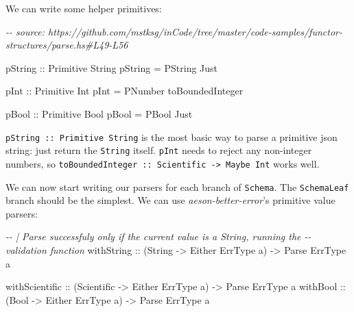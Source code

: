 \documentclass[]{article}
\newenvironment{Shaded}{}{}
\newcommand{\CommentTok}[1]{\textcolor[rgb]{0.38,0.63,0.69}{\textit{#1}}}
\newcommand{\DataTypeTok}[1]{\textcolor[rgb]{0.56,0.13,0.00}{#1}}
\newcommand{\NormalTok}[1]{#1}
\newcommand{\OtherTok}[1]{\textcolor[rgb]{0.00,0.44,0.13}{#1}}
\begin{document}
We can write some helper primitives:

\begin{Shaded}
\begin{Highlighting}[]
\CommentTok{{-}{-} source: https://github.com/mstksg/inCode/tree/master/code{-}samples/functor{-}structures/parse.hs\#L49{-}L56}

\OtherTok{pString ::} \DataTypeTok{Primitive} \DataTypeTok{String}
\NormalTok{pString }\OtherTok{=} \DataTypeTok{PString} \DataTypeTok{Just}

\OtherTok{pInt ::} \DataTypeTok{Primitive} \DataTypeTok{Int}
\NormalTok{pInt }\OtherTok{=} \DataTypeTok{PNumber}\NormalTok{ toBoundedInteger}

\OtherTok{pBool ::} \DataTypeTok{Primitive} \DataTypeTok{Bool}
\NormalTok{pBool }\OtherTok{=} \DataTypeTok{PBool} \DataTypeTok{Just}
\end{Highlighting}
\end{Shaded}

\texttt{pString\ ::\ Primitive\ String} is the most basic way to parse a
primitive json string: just return the \texttt{String} itself. \texttt{pInt}
needs to reject any non-integer numbers, so
\texttt{toBoundedInteger\ ::\ Scientific\ -\textgreater{}\ Maybe\ Int} works
well.

We can now start writing our parsers for each branch of \texttt{Schema}. The
\texttt{SchemaLeaf} branch should be the simplest. We can use
\emph{aeson-better-error}'s primitive value parsers:

\begin{Shaded}
\begin{Highlighting}[]
\CommentTok{{-}{-} | Parse successfuly only if the current value is a String, running the}
\CommentTok{{-}{-} validation function}
\OtherTok{withString     ::}\NormalTok{ (}\DataTypeTok{String}     \OtherTok{{-}\textgreater{}} \DataTypeTok{Either} \DataTypeTok{ErrType}\NormalTok{ a) }\OtherTok{{-}\textgreater{}} \DataTypeTok{Parse} \DataTypeTok{ErrType}\NormalTok{ a}

\OtherTok{withScientific ::}\NormalTok{ (}\DataTypeTok{Scientific} \OtherTok{{-}\textgreater{}} \DataTypeTok{Either} \DataTypeTok{ErrType}\NormalTok{ a) }\OtherTok{{-}\textgreater{}} \DataTypeTok{Parse} \DataTypeTok{ErrType}\NormalTok{ a}
\OtherTok{withBool       ::}\NormalTok{ (}\DataTypeTok{Bool}       \OtherTok{{-}\textgreater{}} \DataTypeTok{Either} \DataTypeTok{ErrType}\NormalTok{ a) }\OtherTok{{-}\textgreater{}} \DataTypeTok{Parse} \DataTypeTok{ErrType}\NormalTok{ a}
\end{Highlighting}
\end{Shaded}
\end{document}
